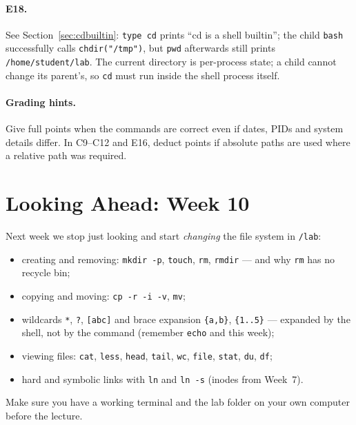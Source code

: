 \documentclass[11pt,a4paper]{article}
\newcommand{\cmd}[1]{\texttt{#1}}
\begin{document}
\paragraph{E18.} See Section~\ref{sec:cdbuiltin}: \cmd{type cd} prints ``cd is a shell builtin''; the child \cmd{bash} successfully calls \texttt{chdir("/tmp")}, but \cmd{pwd} afterwards still prints \texttt{/home/student/lab}. The current directory is per-process state; a child cannot change its parent's, so \cmd{cd} must run inside the shell process itself.

\paragraph{Grading hints.} Give full points when the commands are correct even if dates, PIDs and system details differ. In C9--C12 and E16, deduct points if absolute paths are used where a relative path was required.

\section{Looking Ahead: Week 10}

Next week we stop just looking and start \emph{changing} the file system in \texttt{\tl/lab}:
\begin{itemize}
  \item creating and removing: \cmd{mkdir -p}, \cmd{touch}, \cmd{rm}, \cmd{rmdir} --- and why \cmd{rm} has no recycle bin;
  \item copying and moving: \cmd{cp -r -i -v}, \cmd{mv};
  \item wildcards \texttt{*}, \texttt{?}, \texttt{[abc]} and brace expansion \texttt{\{a,b\}}, \texttt{\{1..5\}} --- expanded by the shell, not by the command (remember \cmd{echo} and \texttt{\tl} this week);
  \item viewing files: \cmd{cat}, \cmd{less}, \cmd{head}, \cmd{tail}, \cmd{wc}, \cmd{file}, \cmd{stat}, \cmd{du}, \cmd{df};
  \item hard and symbolic links with \cmd{ln} and \cmd{ln -s} (inodes from Week~7).
\end{itemize}
Make sure you have a working terminal and the lab folder on your own computer before the lecture.
\end{document}
